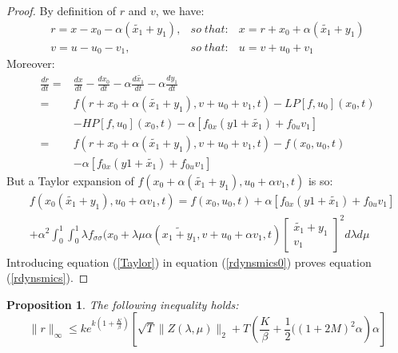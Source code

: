 \documentclass[a4paper,10pt]{article}
\newtheorem{proposition}{Proposition}
\begin{document}
\begin{proof}
    By definition of $r$ and $v$, we have:
    \begin{eqnarray*}
        r=x-x_{0}-\alpha(\tilde{x_{1}}+y_{1}), & so \; that: & x=r+x_{0}+\alpha(\tilde{x_{1}}+y_{1})
	\\
        v=u-u_{0}-v_{1}, & so \; that: & u=v+u_{0}+v_{1}
    \end{eqnarray*}
    Moreover:
    \begin{equation}
		 \label{rdynsmics0}
		\begin{split}
        \frac{dr}{dt}  =  & \frac{dx}{dt} - \frac{dx_{0}}{dt} 
	- \alpha\frac{d\tilde{x_{1}}}{dt} - \alpha \frac{dy_{1}}{dt}
       \\
          = &
	 f(r+x_{0}+\alpha(\tilde{x_{1}}+y_{1}),v+u_{0}+v_{1},t)-LP[f,u_{0}](x_{0},t)
       \\
          & -HP[f,u_{0}](x_{0},t) - \alpha [f_{0x}(y1+\tilde{x_{1}}) + f_{0u}v_{1}]
       \\
           =  &
	 f(r+x_{0}+\alpha(\tilde{x_{1}}+y_{1}),v+u_{0}+v_{1},t)-f(x_{0},u_{0},t)
       \\
         & - \alpha [f_{0x}(y1+\tilde{x_{1}}) + f_{0u}v_{1}]
	\end{split}
     \end{equation}
But a Taylor expansion of $f(x_{0}+ \alpha ( \tilde{x_{1}} + y_{1}), 
u_{0} + \alpha v_{1}, t)$ is so:
\begin{equation}
	\label{Taylor}
	\begin{split}
   & f(x_{0} ( \tilde{x_{1}} + y_{1}), u_{0} + \alpha v_{1}, t) 
   = f(x_{0},u_{0},t) + \alpha [f_{0x}(y1+\tilde{x_{1}}) + f_{0u}v_{1}]
   \\
   & + \alpha^{2} \int_{0}^{1} \int_{0}^{1}
		   \lambda f_{\sigma \sigma}(x_{0}+\lambda\mu\alpha(\tilde{x_{1}+y_{1}},
		       v + u_{0} + \alpha v_{1},t)
		       \left[
		       \begin{array}
		       {c}
		           \tilde{x_{1}} + y_{1}  \\
		           v_{1}  
		       \end{array}
		       \right]^{2} d \lambda d \mu
			   \end{split}
\end{equation}
Introducing equation (\ref{Taylor}) in equation (\ref{rdynsmics0}) 
proves equation (\ref{rdynsmics}).
\end{proof}
\begin{proposition}
    The following inequality holds:
    \begin{equation}
        \|r\|_{\infty} \leq ke^{k\left(1+\frac{K}{\beta}\right)}
	     \left[\sqrt{T}\|Z(\lambda,\mu)\|_{2}
	     +T\left(\frac{K}{\beta}+\frac{1}{2}((1+2M)^{2} \alpha\right)\alpha \right]
        \label{rinftybound}
    \end{equation}
\end{proposition}
\end{document}
